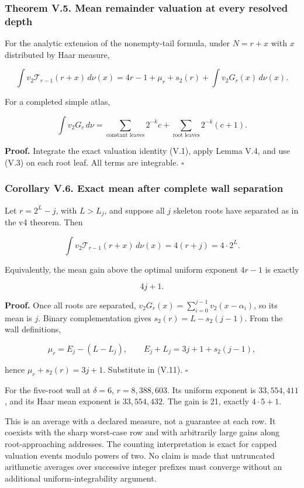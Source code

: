 \documentclass[11pt,letterpaper]{article}
\begin{document}
\subsubsection{Theorem V.5. Mean remainder valuation at every resolved depth}\label{theorem-v.5.-mean-remainder-valuation-at-every-resolved-depth}

For the analytic extension of the nonempty-tail formula, under \(N=r+x\) with \(x\) distributed by Haar measure,

\[
\boxed{
\int v_2\mathcal T_{r-1}(r+x)\,d\nu(x)
=4r-1+\mu_r+s_2(r)+\int v_2G_r(x)\,d\nu(x).
} \tag{V.11}
\]

For a completed simple atlas,

\[
\int v_2G_r\,d\nu
=\sum_{\text{constant leaves}}2^{-k}c
+\sum_{\text{root leaves}}2^{-k}(c+1). \tag{V.12}
\]

\textbf{Proof.} Integrate the exact valuation identity (V.1), apply Lemma V.4, and use (V.3) on each root leaf. All terms are integrable. \(\square\)

\subsubsection{Corollary V.6. Exact mean after complete wall separation}\label{corollary-v.6.-exact-mean-after-complete-wall-separation}

Let \(r=2^L-j\), with \(L>L_j\), and suppose all \(j\) skeleton roots have separated as in the v4 theorem. Then

\[
\boxed{
\int v_2\mathcal T_{r-1}(r+x)\,d\nu(x)
=4(r+j)=4\cdot2^L.
} \tag{V.13}
\]

Equivalently, the mean gain above the optimal uniform exponent \(4r-1\) is exactly

\[
\boxed{4j+1.}
\]

\textbf{Proof.} Once all roots are separated, \(v_2G_r(x)=\sum_{i=0}^{j-1}v_2(x-\alpha_i)\), so its mean is \(j\). Binary complementation gives \(s_2(r)=L-s_2(j-1)\). From the wall definitions,

\[
\mu_r=E_j-(L-L_j),\qquad
E_j+L_j=3j+1+s_2(j-1),
\]

hence \(\mu_r+s_2(r)=3j+1\). Substitute in (V.11). \(\square\)

For the five-root wall at \(\delta=6\), \(r=8{,}388{,}603\). Its uniform exponent is \(33{,}554{,}411\), and its Haar mean exponent is \(33{,}554{,}432\). The gain is 21, exactly \(4\cdot5+1\).

This is an average with a declared measure, not a guarantee at each row. It coexists with the sharp worst-case row and with arbitrarily large gains along root-approaching addresses. The counting interpretation is exact for capped valuation events modulo powers of two. No claim is made that untruncated arithmetic averages over successive integer prefixes must converge without an additional uniform-integrability argument.
\end{document}
